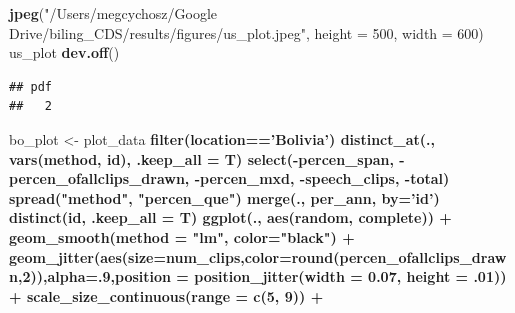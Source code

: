 \documentclass[
]{article}
\newenvironment{Shaded}{\begin{snugshade}}{\end{snugshade}}
\newcommand{\DataTypeTok}[1]{\textcolor[rgb]{0.13,0.29,0.53}{#1}}
\newcommand{\DecValTok}[1]{\textcolor[rgb]{0.00,0.00,0.81}{#1}}
\newcommand{\FloatTok}[1]{\textcolor[rgb]{0.00,0.00,0.81}{#1}}
\newcommand{\KeywordTok}[1]{\textcolor[rgb]{0.13,0.29,0.53}{\textbf{#1}}}
\newcommand{\NormalTok}[1]{#1}
\newcommand{\OperatorTok}[1]{\textcolor[rgb]{0.81,0.36,0.00}{\textbf{#1}}}
\newcommand{\StringTok}[1]{\textcolor[rgb]{0.31,0.60,0.02}{#1}}
\begin{document}
\begin{Shaded}
\begin{Highlighting}[]
\KeywordTok{jpeg}\NormalTok{(}\StringTok{"/Users/megcychosz/Google Drive/biling_CDS/results/figures/us_plot.jpeg"}\NormalTok{, }\DataTypeTok{height =} \DecValTok{500}\NormalTok{, }\DataTypeTok{width =} \DecValTok{600}\NormalTok{)}
\NormalTok{us_plot}
\KeywordTok{dev.off}\NormalTok{()}
\end{Highlighting}
\end{Shaded}

\begin{verbatim}
## pdf 
##   2
\end{verbatim}

\begin{Shaded}
\begin{Highlighting}[]
\NormalTok{bo_plot <-}\StringTok{ }\NormalTok{plot_data }\OperatorTok{%
\StringTok{  }\KeywordTok{filter}\NormalTok{(location}\OperatorTok{==}\StringTok{'Bolivia'}\NormalTok{) }\OperatorTok{%
\StringTok{  }\KeywordTok{distinct_at}\NormalTok{(., }\KeywordTok{vars}\NormalTok{(method, id), }\DataTypeTok{.keep_all =}\NormalTok{ T) }\OperatorTok{%
\StringTok{  }\KeywordTok{select}\NormalTok{(}\OperatorTok{-}\NormalTok{percen_span, }\OperatorTok{-}\NormalTok{percen_ofallclips_drawn, }\OperatorTok{-}\NormalTok{percen_mxd, }\OperatorTok{-}\NormalTok{speech_clips, }\OperatorTok{-}\NormalTok{total) }\OperatorTok{%
\StringTok{  }\KeywordTok{spread}\NormalTok{(}\StringTok{"method"}\NormalTok{, }\StringTok{"percen_que"}\NormalTok{) }\OperatorTok{%
\StringTok{  }\KeywordTok{merge}\NormalTok{(., per_ann, }\DataTypeTok{by=}\StringTok{'id'}\NormalTok{) }\OperatorTok{%
\StringTok{  }\KeywordTok{distinct}\NormalTok{(id, }\DataTypeTok{.keep_all =}\NormalTok{ T) }\OperatorTok{%
\KeywordTok{ggplot}\NormalTok{(., }\KeywordTok{aes}\NormalTok{(random, complete)) }\OperatorTok{+}
\StringTok{  }\KeywordTok{geom_smooth}\NormalTok{(}\DataTypeTok{method =} \StringTok{"lm"}\NormalTok{, }\DataTypeTok{color=}\StringTok{"black"}\NormalTok{) }\OperatorTok{+}
\StringTok{  }\KeywordTok{geom_jitter}\NormalTok{(}\KeywordTok{aes}\NormalTok{(}\DataTypeTok{size=}\NormalTok{num_clips,}\DataTypeTok{color=}\KeywordTok{round}\NormalTok{(percen_ofallclips_drawn,}\DecValTok{2}\NormalTok{)),}\DataTypeTok{alpha=}\NormalTok{.}\DecValTok{9}\NormalTok{,}\DataTypeTok{position =} \KeywordTok{position_jitter}\NormalTok{(}\DataTypeTok{width =} \FloatTok{0.07}\NormalTok{, }\DataTypeTok{height =} \FloatTok{.01}\NormalTok{)) }\OperatorTok{+}
\StringTok{  }\KeywordTok{scale_size_continuous}\NormalTok{(}\DataTypeTok{range =} \KeywordTok{c}\NormalTok{(}\DecValTok{5}\NormalTok{, }\DecValTok{9}\NormalTok{)) }\OperatorTok{+}\StringTok{ }
}}}}}}}
\end{Highlighting}
\end{Shaded}
\end{document}
